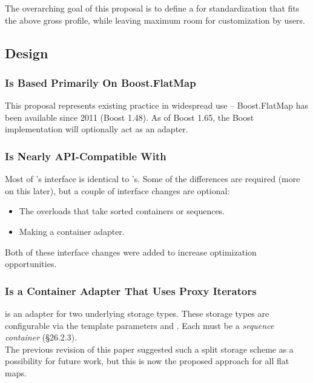 The overarching goal of this proposal is to define a  for
standardization that fits the above gross profile, while leaving maximum room
for customization by users.

\subsection{Design}

\subsubsection{ Is Based Primarily On Boost.FlatMap}

This proposal represents existing practice in widespread use -- Boost.FlatMap
has been available since 2011 (Boost 1.48).  As of Boost 1.65, the Boost
implementation will optionally act as an adapter.

\subsubsection{ Is Nearly API-Compatible With }

Most of 's interface is identical to 's.  Some of the
differences are required (more on this later), but a couple of interface
changes are optional:

\begin{itemize}
  \item The overloads that take sorted containers or sequences.

  \item Making  a container adapter.
\end{itemize}

Both of these interface changes were added to increase optimization
opportunities.

\subsubsection{ Is a Container Adapter That Uses Proxy Iterators}

 is an adapter for two underlying storage types.  These storage
types are configurable via the template parameters  and
.  Each must be a \textit{sequence container}
(\S26.2.3).\\

The previous revision of this paper suggested such a split storage scheme as a
possibility for future work, but this is now the proposed approach for all
flat maps.\\

